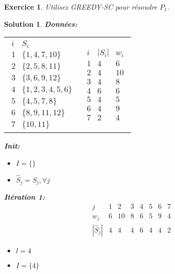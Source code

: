 \documentclass[a4paper,11pt]{report}
\newcommand{\algo}[1]{\textsc{#1}}
\newtheorem{exercice}{Exercice}
\newtheorem{solution}{Solution}
\begin{document}
\begin{exercice}
Utilisez \algo{GREEDY-SC} pour résoudre $P_1$.
\end{exercice}

\begin{solution}
\noindent\textbf{Données:}\\
\begin{center}
\begin{tabular}{lr}
$
\begin{array}{c|c}
i & S_i\\
\hline
1 & \{1,4,7,10\} \\
2 & \{2,5,8,11\} \\
3 & \{3,6,9,12\} \\
4 & \{1,2,3,4,5,6\} \\
5 & \{4,5,7,8\} \\
6 & \{8,9,11,12\} \\
7 & \{10,11\}
\end{array}
$
&
$
\begin{array}{c|cc}
i & |S_i| & w_i\\
\hline
1 & 4     & 6  \\
2 & 4     & 10 \\
3 & 4     & 8  \\
4 & 6     & 6  \\
5 & 4     & 5  \\
6 & 4     & 9  \\
7 & 2     & 4
\end{array}
$
\end{tabular}
\end{center}

\noindent\textbf{Init:}
\begin{itemize}
\item $I = \{\}$
\item $\widehat{S}_j = S_j, \forall j$
\end{itemize}

\noindent\textbf{Itération 1:}
$$
\begin{array}{c|ccccccc}
j               & 1 & 2  & 3 & 4 & 5 & 6 & 7\\
\hline
w_j             & 6 & 10 & 8 & 6 & 5 & 9 & 4\\
|\widehat{S}_j| & 4 & 4  & 4 & 6 & 4 & 4 & 2
\end{array}
$$

\begin{itemize}
\item $l = 4$
\item $I = \{4\}$
\end{itemize}


\end{solution}
\end{document}
